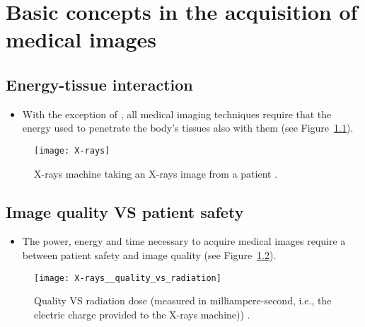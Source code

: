 
\chapter{Basic concepts in the acquisition of medical images}

\section{Energy-tissue interaction}
\begin{itemize}
\item With the exception of , all medical imaging
  techniques require that the energy used to penetrate the body's
  tissues also  with them \cite{bushberg2011essential} (see
  Figure~\ref{fig:X-rays}).
\end{itemize}
\vspace{-0ex}
\begin{figure}[!h]
  \centering
  \texttt{[image: X-rays]}
  \caption{X-rays machine taking an X-rays image from a
    patient \cite{CC2025Xray}.\label{fig:X-rays}}
\end{figure}

\section{Image quality VS patient safety}
\begin{itemize}
\item The power, energy and time necessary to acquire medical images
  require a  between patient safety and image quality
  \cite{bushberg2011essential} (see
  Figure~\ref{fig:quality_vs_radiation}).
\end{itemize}
\vspace{-0ex}
\begin{figure}[!h]
  \centering
  \texttt{[image: X-rays\_\_quality\_vs\_radiation]}
  \caption{Quality VS radiation dose (measured in milliampere-second,
    i.e., the electric charge provided to the X-rays
    machine))
    \cite{huda2015radiographic}.\label{fig:quality_vs_radiation}}
\end{figure}

